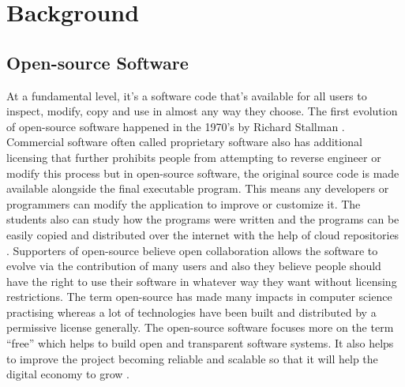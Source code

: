 %
\section{Background}\label{sec:background}
%
\subsection{Open-source Software}
At a fundamental level, it's a software code that's available for all users to inspect, modify, copy and use in almost any way they choose. The first evolution of open-source software happened in the 1970's by Richard Stallman \cite{zh2011}. Commercial software often called proprietary software also has additional licensing that further prohibits people from attempting to reverse engineer or modify this process but in open-source software, the original source code is made available alongside the final executable program. This means any developers or programmers can modify the application to improve or customize it. The students also can study how the programs were written and the programs can be easily copied and distributed over the internet with the help of cloud repositories \cite{MiViIa2013}. Supporters of open-source believe open collaboration allows the software to evolve via the contribution of many users and also they believe people should have the right to use their software in whatever way they want without licensing restrictions. The term open-source has made many impacts in computer science practising whereas a lot of technologies have been built and distributed by a permissive license generally. The open-source software focuses more on the term “free” which helps to build open and transparent software systems. It also helps to improve the project becoming reliable and scalable so that it will help the digital economy to grow \cite{MiViIa2013}.
%
